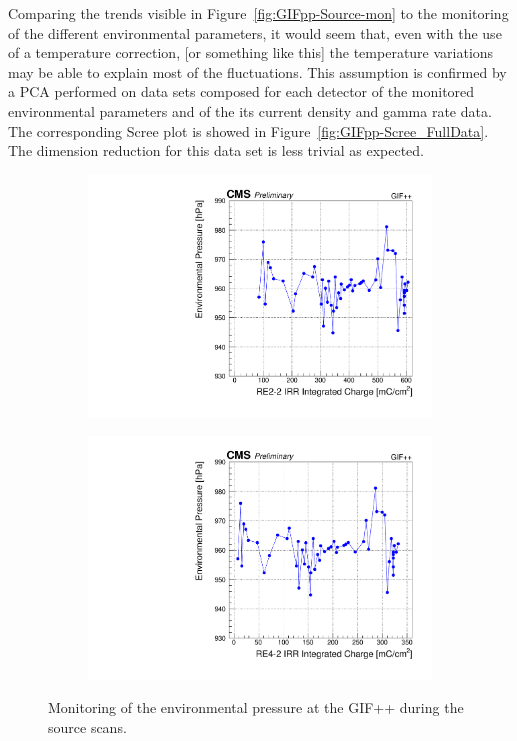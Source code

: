 	Comparing the trends visible in Figure~\ref{fig:GIFpp-Source-mon} to the monitoring of the different environmental parameters, it would seem that, even with the use of a temperature correction, [or something like this] the temperature variations may be able to explain most of the fluctuations. This assumption is confirmed by a PCA performed on data sets composed for each detector of the monitored environmental parameters and of the its current density and gamma rate data. The corresponding Scree plot is showed in Figure~\ref{fig:GIFpp-Scree_FullData}. The dimension reduction for this data set is less trivial as expected.

	\begin{figure}[H]
    	\begin{subfigure}{0.5\linewidth}
    		\centering
			\includegraphics[width = \linewidth]{fig/chapt5/RE2-2-Pressure-monitoring.pdf}
        	\caption{\label{fig:GIFpp-Pressure:A}}
    	\end{subfigure}
    	\begin{subfigure}{0.5\linewidth}
			\centering
    		\includegraphics[width = \linewidth]{fig/chapt5/RE4-2-Pressure-monitoring.pdf}
        	\caption{\label{fig:GIFpp-Pressure:B}}
    	\end{subfigure}
		\caption{\label{fig:GIFpp-Pressure} Monitoring of the environmental pressure at the GIF++ during the source scans.}
	\end{figure}
	
